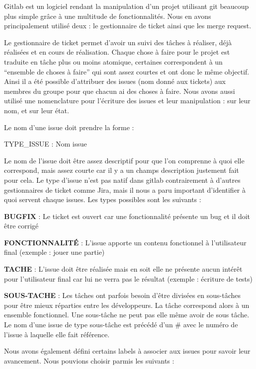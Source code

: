 \hspace{3em}
Gitlab est un logiciel rendant la manipulation d’un projet utilisant git beaucoup plus simple grâce à une multitude de fonctionnalités. Nous en avons principalement utilisé deux : le gestionnaire de ticket ainsi que les merge request.

	Le gestionnaire de ticket permet d’avoir un suivi des tâches à réaliser, déjà réalisées et en cours de réalisation. Chaque chose à faire pour le projet est traduite en tâche plus ou moins atomique, certaines correspondent à un “ensemble de choses à faire” qui sont assez courtes et ont donc le même objectif. Ainsi il a été possible d’attribuer des issues (nom donné aux tickets) aux membres du groupe pour que chacun ai des choses à faire. Nous avons aussi utilisé une nomenclature pour l’écriture des issues et leur manipulation : sur leur nom, et sur leur état.

	Le nom d’une issue doit prendre la forme :

	TYPE\_ISSUE : Nom issue

Le nom de l’issue doit être assez descriptif pour que l’on comprenne à quoi elle correspond, mais assez courte car il y a un champs description justement fait pour cela.
Le type d’issue n’est pas natif dans gitlab contrairement à d’autres gestionnaires de ticket comme Jira, mais il nous a paru important d’identifier à quoi servent chaque issues.
Les types possibles sont les suivants :

\textbf{BUGFIX} : Le ticket est ouvert car une fonctionnalité présente un bug et il doit être corrigé

\textbf{FONCTIONNALITÉ} : L’issue apporte un contenu fonctionnel à l’utilisateur final (exemple : jouer une partie)

\textbf{TACHE} : L’issue doit être réalisée mais en soit elle ne présente aucun intérêt pour l’utilisateur final car lui ne verra pas le résultat (exemple : écriture de tests)

\textbf{SOUS-TACHE} : Les tâches ont parfois besoin d’être divisées en sous-tâches pour être mieux réparties entre les développeurs. La tâche correspond alors à un ensemble fonctionnel. Une sous-tâche ne peut pas elle même avoir de sous tâche. Le nom d’une issue de type sous-tâche est précédé d’un \# avec le numéro de l’issue à laquelle elle fait référence.

Nous avons également défini certains labels à associer aux issues pour savoir leur avancement. Nous pouvions choisir parmis les suivants :

